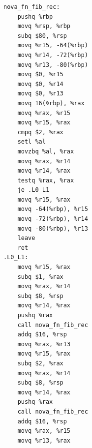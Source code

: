\begin{lstlisting}[basicstyle=\ttfamily\scriptsize]
nova_fn_fib_rec:
    pushq %rbp
    movq %rsp, %rbp
    subq $80, %rsp
    movq %r15, -64(%rbp)
    movq %r14, -72(%rbp)
    movq %r13, -80(%rbp)
    movq $0, %r15
    movq $0, %r14
    movq $0, %r13
    movq 16(%rbp), %rax
    movq %rax, %r15
    movq %r15, %rax
    cmpq $2, %rax
    setl %al
    movzbq %al, %rax
    movq %rax, %r14
    movq %r14, %rax
    testq %rax, %rax
    je .L0_L1
    movq %r15, %rax
    movq -64(%rbp), %r15
    movq -72(%rbp), %r14
    movq -80(%rbp), %r13
    leave
    ret
.L0_L1:
    movq %r15, %rax
    subq $1, %rax
    movq %rax, %r14
    subq $8, %rsp
    movq %r14, %rax
    pushq %rax
    call nova_fn_fib_rec
    addq $16, %rsp
    movq %rax, %r13
    movq %r15, %rax
    subq $2, %rax
    movq %rax, %r14
    subq $8, %rsp
    movq %r14, %rax
    pushq %rax
    call nova_fn_fib_rec
    addq $16, %rsp
    movq %rax, %r15
    movq %r13, %rax
\end{lstlisting}
